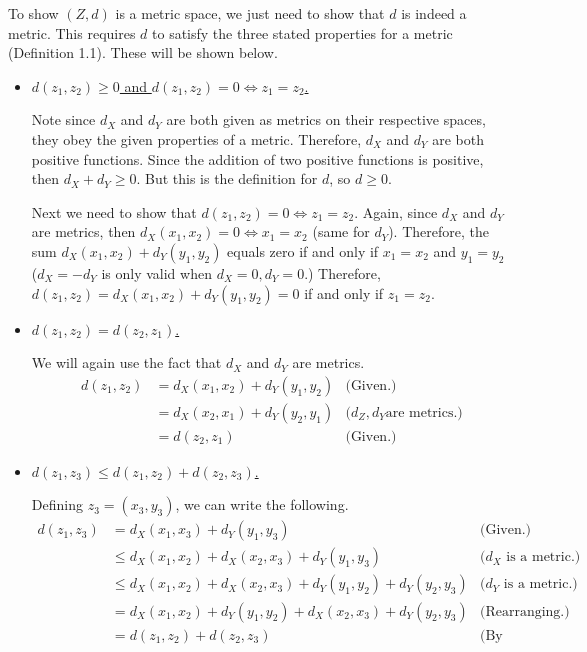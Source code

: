 \begin{solution}

To show $(Z, d)$ is a metric space, we just need to show that $d$ is indeed a metric. This requires $d$ to satisfy the three stated properties for a metric (Definition 1.1). These will be shown below. 
\begin{itemize}
    \item \underline{$d(z_1, z_2) \geq 0$ and $d(z_1, z_2) = 0 \iff z_1 = z_2$.}

    \jump
    Note since $d_X$ and $d_Y$ are both given as metrics on their respective spaces, they obey the given properties of a metric. Therefore, $d_X$ and $d_Y$ are both positive functions. Since the addition of two positive functions is positive, then $d_X + d_Y \geq 0$. But this is the definition for $d$, so $d \geq 0$. \par

    Next we need to show that $d(z_1, z_2) = 0 \iff z_1 = z_2.$ Again, since $d_X$ and $d_Y$ are metrics, then $d_X(x_1, x_2) = 0 \iff x_1 = x_2$ (same for $d_Y$). Therefore, the sum $d_X(x_1, x_2) + d_Y(y_1, y_2)$ equals zero if and only if $x_1 = x_2$ and $y_1 = y_2$ ($d_X = -d_Y$ is only valid when $d_X = 0, d_Y = 0$.) Therefore, $d(z_1, z_2) = d_X(x_1, x_2) + d_Y(y_1, y_2) = 0$ if and only if $z_1 = z_2$.

    \item \underline{$d(z_1, z_2) = d(z_2, z_1)$.}

    \jump
    We will again use the fact that $d_X$ and $d_Y$ are metrics. 
    \tightalignbreak
    \begin{align*}
        d(z_1, z_2) &= d_X(x_1, x_2) + d_Y(y_1, y_2) &\text{(Given.)}\\
        &= d_X(x_2, x_1) + d_Y(y_2, y_1) &(d_Z, d_Y \text{are metrics.)}\\
        &= d(z_2, z_1) &\text{(Given.)}
    \end{align*}
    \endtightalignbreak
\newpage
    \item \underline{$d(z_1, z_3) \leq d(z_1, z_2) + d(z_2, z_3)$.}

    \jump
    Defining $z_3 = (x_3, y_3)$, we can write the following. 
    \tightalignbreak
    \begin{align*}
        d(z_1, z_3) &= d_X(x_1, x_3) + d_Y(y_1, y_3) &\text{(Given.)}\\
        &\leq d_X(x_1, x_2) + d_X(x_2, x_3) + d_Y(y_1, y_3) &\text{($d_X$ is a metric.)}\\
        &\leq d_X(x_1, x_2) + d_X(x_2, x_3) + d_Y(y_1, y_2) + d_Y(y_2, y_3) &\text{($d_Y$ is a metric.)}\\
        &= d_X(x_1, x_2) + d_Y(y_1, y_2) + d_X(x_2, x_3) + d_Y(y_2, y_3) &\text{(Rearranging.)}\\
        &= d(z_1, z_2) + d(z_2, z_3) &\text{(By definition.)}
    \end{align*}
    \endtightalignbreak
\end{itemize}
\end{solution}

